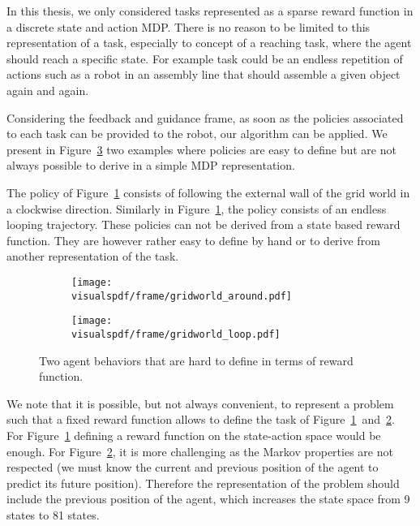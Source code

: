 In this thesis, we only considered tasks represented as a sparse reward function in a discrete state and action MDP. There is no reason to be limited to this representation of a task, especially to concept of a reaching task, where the agent should reach a specific state. For example task could be an endless repetition of actions such as a robot in an assembly line that should assemble a given object again and again.

Considering the feedback and guidance frame, as soon as the policies associated to each task can be provided to the robot, our algorithm can be applied. We present in Figure~\ref{fig:gridwolrdgenericframes} two examples where policies are easy to define but are not always possible to derive in a simple MDP representation.

The policy of Figure~\ref{fig:gridwolrdgenericframesaround} consists of following the external wall of the grid world in a clockwise direction. Similarly in Figure~\ref{fig:gridwolrdgenericframesaround}, the policy consists of an endless looping trajectory. These policies can not be derived from a state based reward function. They are however rather easy to define by hand or to derive from another representation of the task.

\begin{figure}[!htbp]
\centering
    \begin{subfigure}[b]{0.49\columnwidth}
        \centering
        \texttt{[image: \\visualspdf/frame/gridworld\_around.pdf]}
        \caption{}
        \label{fig:gridwolrdgenericframesaround}
    \end{subfigure}
    \begin{subfigure}[b]{0.49\columnwidth}
        \centering
        \texttt{[image: \\visualspdf/frame/gridworld\_loop.pdf]}
        \caption{}
        \label{fig:gridwolrdgenericframesloop}
    \end{subfigure}
\caption{Two agent behaviors that are hard to define in terms of reward function.}
\label{fig:gridwolrdgenericframes}
\end{figure}

We note that it is possible, but not always convenient, to represent a problem such that a fixed reward function allows to define the task of Figure~\ref{fig:gridwolrdgenericframesaround}~and~\ref{fig:gridwolrdgenericframesloop}. For Figure~\ref{fig:gridwolrdgenericframesaround} defining a reward function on the state-action space would be enough. For Figure~\ref{fig:gridwolrdgenericframesloop}, it is more challenging as the Markov properties are not respected (we must know the current and previous position of the agent to predict its future position). Therefore the representation of the problem should include the previous position of the agent, which increases the state space from 9 states to 81 states.

